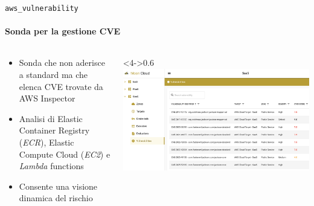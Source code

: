 \documentclass{beamer}
\begin{document}
\begin{frame}{\texttt{aws\_vulnerability}}
    \framesubtitle{Sonda per la gestione CVE}
    \begin{columns}
        \begin{column}{0.4\textwidth}
            \begin{itemize}
            \item<1-> Sonda che non aderisce a standard ma che elenca CVE trovate da AWS Inspector
            \item<2-> Analisi di Elastic Container Registry (\emph{ECR}), 
                Elastic Compute Cloud (\emph{EC2}) e \emph{Lambda} functions
            \item<3-> Consente una visione dinamica del rischio
        \end{itemize}
        \end{column}
        \begin{column}<4->{0.6\textwidth}
            \includegraphics[width=\textwidth]{assets/cveiaas.png}
        \end{column}
    \end{columns}
\end{frame}
\end{document}
